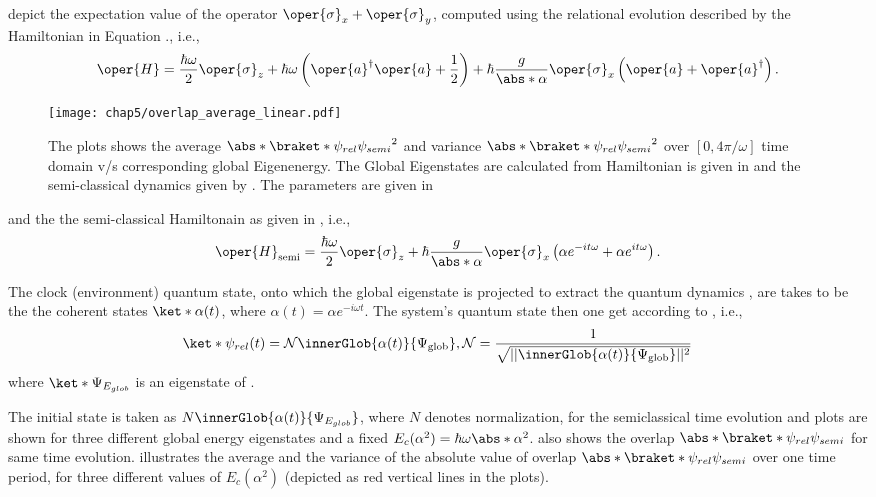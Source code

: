  depict the expectation value of the operator  \(\oper{\sigma}_x + \oper{\sigma}_y\), 
computed using the relational evolution described by the Hamiltonian in Equation ., i.e., 
\begin{eqnarray}
    \label{eq:chap5_JCM_Hamiltonian_linear}
    \oper{H} = \frac{\hbar \omega}{2} \oper{\sigma}_z + \hbar \omega \left(\oper{a}^\dagger \oper{a} + \frac{1}{2}\right) 
    + \hbar \frac{ g}{\abs*{\alpha}} \oper{\sigma}_x\left(\oper{a} + \oper{a}^\dagger\right).
\end{eqnarray}
\begin{figure}[!h]
    \centering
    \texttt{[image: chap5/overlap\_average\_linear.pdf]}
    \caption{
     The plots shows the average $\abs*{\braket*{\psi_{rel}}{\psi_{semi}}}^2$ and 
     variance $\abs*{\braket*{\psi_{rel}}{\psi_{semi}}}^2$ over \([0, 4\pi/\omega]\) time domain 
     v/s corresponding global Eigenenergy.
     The Global Eigenstates are calculated from 
    Hamiltonian is given in  and the semi-classical dynamics given by . The parameters 
    are given in }
     \label{fig:chap5_linear_overlap_avg}
\end{figure}
and the the semi-classical Hamiltonain as given in , i.e., 
\begin{eqnarray}
\label{eq:chap5_semi_classical_JC_Linear}
    \oper{H}_{\text{semi}} = \frac{\hbar\omega}{2} \oper{\sigma}_z 
    + \hbar \frac{g}{\abs*{\alpha}} \oper{\sigma}_x\left( \alpha e^{-it\omega} + \alpha e^{it\omega} \right).
\end{eqnarray}

The clock (environment) quantum state, onto which the global eigenstate is projected 
to extract the 
quantum dynamics , 
are takes to be the
the coherent states \(\ket*{\alpha (t)}\), where \(\alpha(t) = \alpha e^{-i\omega t}\). The system's quantum state then one get according to , i.e.,  
\begin{equation}
    \ket*{\psi_{rel}(t)} = \mathcal{N} \innerGlob{\alpha(t)}{\Psi_{\mathrm{glob}}},
    \mathcal{N} = \frac{1}{\sqrt{\lvert \lvert \innerGlob{\alpha(t)}{\Psi_{\mathrm{glob}}} \rvert \rvert^2}}
\end{equation}
where \(\ket*{\Psi_{E_{glob}}}\) is an eigenstate of . 

The initial state is taken as \(N\innerGlob{\alpha(t)}{\Psi_{E_{glob}}}\), where $N$ denotes normalization, for the semiclassical time evolution and plots are shown 
for three different global energy eigenstates and a fixed \(E_c(\alpha^2) = \hbar \omega \abs*{\alpha}^2\).  also shows the overlap \(\abs*{\braket*{\psi_{rel}}{\psi_{semi}}}\)
for same time evolution.  illustrates the average and the 
variance of the absolute value of overlap \(\abs*{\braket*{\psi_{rel}}{\psi_{semi}}}\) over one time period, 
for three different values of \(E_c(\alpha^2)\) (depicted as red vertical lines in the plots). 

